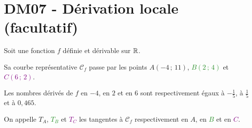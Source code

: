 \documentclass[a4paper,11pt]{article}
\author{Pierquet}
\title{\nomfichier}
\begin{document}
\pagestyle{fancy}

\thispagestyle{entetedm}

\setcounter{numexos}{0}

\part{DM07 - Dérivation locale (facultatif)}

\medskip


\medskip

Soit une fonction $f$ définie et dérivable sur $\R$.

Sa courbe représentative {\red $\mathscr{C}_f$} passe par les points {\blue $A(-4\,;\,11)$}, \textcolor{ForestGreen}{$B(2\,;\,4)$} et \textcolor{purple}{$C(6\,;\,2)$}.

Les nombres dérivés de $f$ en $-4$, en $2$ et en $6$ sont respectivement égaux à $-\frac{1}{5}$, à $\frac{1}{5}$ et à $0,465$.

\smallskip

On appelle {\blue $T_A$}, \textcolor{ForestGreen}{$T_B$} et \textcolor{purple}{$T_C$} les tangentes à {\red $\mathscr{C}_f$} respectivement en {\blue $A$}, en \textcolor{ForestGreen}{$B$} et en \textcolor{purple}{$C$}.
\end{document}

